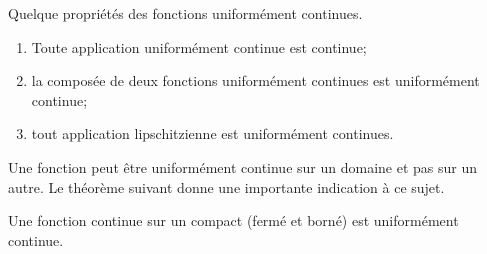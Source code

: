 \begin{proposition}
	Quelque propriétés des fonctions uniformément continues.
	\begin{enumerate}
		\item
			Toute application uniformément continue est continue;
		\item
			la composée de deux fonctions uniformément continues est uniformément continue;
		\item
			tout application lipschitzienne est uniformément continues.
	\end{enumerate}
\end{proposition}

Une fonction peut être uniformément continue sur un domaine et pas sur un autre. Le théorème suivant donne une importante indication à ce sujet.
\begin{theorem}[Heine]		\label{ThoHeineContinueCompact}
	Une fonction continue sur un compact (fermé et borné) est uniformément continue.
\end{theorem}

